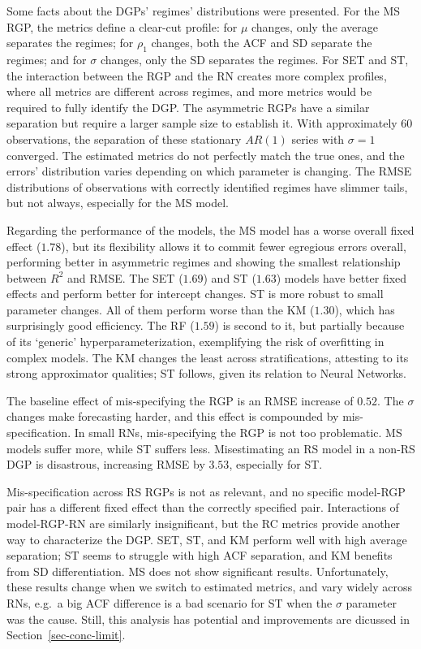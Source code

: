 \documentclass[
  letterpaper,
  DIV=11,
  numbers=noendperiod]{scrartcl}
\numberwithin{equation}{section}
\numberwithin{table}{section}
\numberwithin{figure}{section}
\begin{document}
Some facts about the DGPs' regimes' distributions were presented. For
the MS RGP, the metrics define a clear-cut profile: for \(\mu\) changes,
only the average separates the regimes; for \(\rho_1\) changes, both the
ACF and SD separate the regimes; and for \(\sigma\) changes, only the SD
separates the regimes. For SET and ST, the interaction between the RGP
and the RN creates more complex profiles, where all metrics are
different across regimes, and more metrics would be required to fully
identify the DGP. The asymmetric RGPs have a similar separation but
require a larger sample size to establish it. With approximately 60
observations, the separation of these stationary \(AR(1)\) series with
\(\sigma = 1\) converged. The estimated metrics do not perfectly match
the true ones, and the errors' distribution varies depending on which
parameter is changing. The RMSE distributions of observations with
correctly identified regimes have slimmer tails, but not always,
especially for the MS model.

Regarding the performance of the models, the MS model has a worse
overall fixed effect (\(1.78\)), but its flexibility allows it to commit
fewer egregious errors overall, performing better in asymmetric regimes
and showing the smallest relationship between \(R^2\) and RMSE. The SET
(\(1.69\)) and ST (\(1.63\)) models have better fixed effects and
perform better for intercept changes. ST is more robust to small
parameter changes. All of them perform worse than the KM (\(1.30\)),
which has surprisingly good efficiency. The RF (\(1.59\)) is second to
it, but partially because of its `generic' hyperparameterization,
exemplifying the risk of overfitting in complex models. The KM changes
the least across stratifications, attesting to its strong approximator
qualities; ST follows, given its relation to Neural Networks.

The baseline effect of mis-specifying the RGP is an RMSE increase of
\(0.52\). The \(\sigma\) changes make forecasting harder, and this
effect is compounded by mis-specification. In small RNs, mis-specifying
the RGP is not too problematic. MS models suffer more, while ST suffers
less. Misestimating an RS model in a non-RS DGP is disastrous,
increasing RMSE by \(3.53\), especially for ST.

Mis-specification across RS RGPs is not as relevant, and no specific
model-RGP pair has a different fixed effect than the correctly specified
pair. Interactions of model-RGP-RN are similarly insignificant, but the
RC metrics provide another way to characterize the DGP. SET, ST, and KM
perform well with high average separation; ST seems to struggle with
high ACF separation, and KM benefits from SD differentiation. MS does
not show significant results. Unfortunately, these results change when
we switch to estimated metrics, and vary widely across RNs, e.g.~a big
ACF difference is a bad scenario for ST when the \(\sigma\) parameter
was the cause. Still, this analysis has potential and improvements are
dicussed in Section~\ref{sec-conc-limit}.
\end{document}
